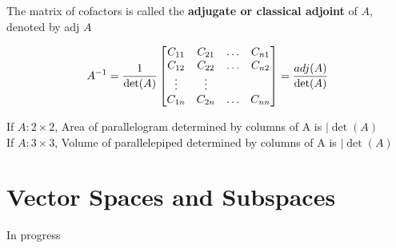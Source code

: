 \documentclass{report}
\begin{document}
The matrix of cofactors is called the \textbf{adjugate or classical adjoint} of $A$,
denoted by adj $A$

\begin{theorem}
    \[
    A^{-1} = \frac{1}{\det(A)}\begin{bmatrix}
        C_{11} & C_{21} &\ldots & C_{n1} \\
        C_{12} & C_{22} &\ldots & C_{n2} \\
        \vdots & \vdots & \\
        C_{1n} & C_{2n} &\ldots & C_{nn} \\
    \end{bmatrix} = \frac{adj(A)}{\det(A)}
    \] 
\end{theorem}

\begin{theorem}
    If $A: 2 \times 2$, Area of parallelogram determined by columns of A is $|\det(A)$\\
    If $A: 3 \times 3$, Volume of parallelepiped determined by columns of A is $|\det(A)$\\
\end{theorem}

\chapter{Vector Spaces and Subspaces}

In progress
\end{document}

